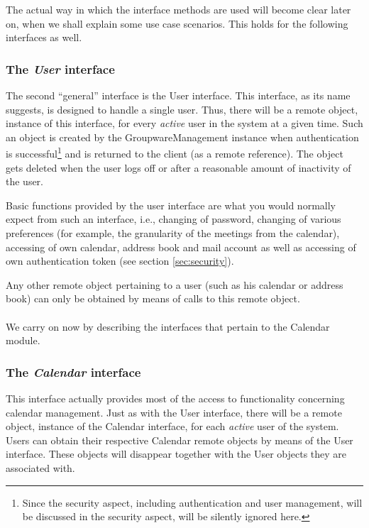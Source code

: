 \documentclass[a4paper,10pt]{article}
\begin{document}
The actual way in which the interface methods are used will become clear later on, when we shall
explain some use case scenarios. This holds for the following interfaces as well.

\subsubsection*{The \emph{User} interface}

The second ``general'' interface is the User interface. This interface, as its name suggests, is
designed to handle a single user. Thus, there will be a remote object, instance of this interface,
for every \emph{active} user in the system at a given time. Such an object is created by the
GroupwareManagement instance when authentication is successful\footnote{Since the security
aspect, including authentication and user management, will be discussed in the security aspect,
will be silently ignored here.} and is returned to the client (as a remote reference). The object
gets deleted when the user logs off or after a reasonable amount of inactivity of the user.

Basic functions provided by the user interface are what you would normally expect from such
an interface, i.e., changing of password, changing of various preferences (for example, the
granularity of the meetings from the calendar), accessing of own calendar, address book and
mail account as well as accessing of own authentication token (see section \ref{sec:security}).

Any other remote object pertaining to a user (such as his calendar or address book) can only be
obtained by means of calls to this remote object.\\
\\
We carry on now by describing the interfaces that pertain to the Calendar module.

\subsubsection*{The \emph{Calendar} interface}

This interface actually provides most of the access to functionality concerning calendar
management. Just as with the User interface, there will be a remote object, instance of
the Calendar interface, for each \emph{active} user of the system. Users can obtain their
respective Calendar remote objects by means of the User interface. These objects will disappear
together with the User objects they are associated with.
\end{document}
